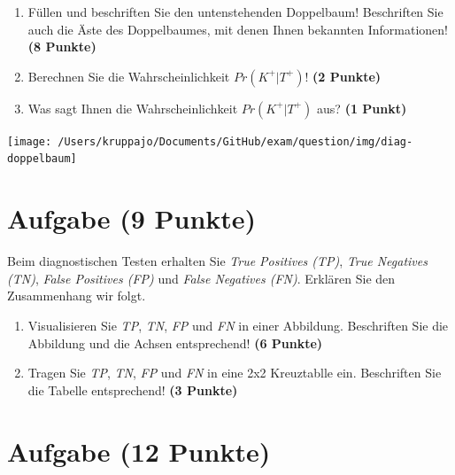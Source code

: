 \documentclass[a4paper, 10pt]{scrartcl}\usepackage[]{graphicx}\usepackage[]{xcolor}
\begin{document}
\begin{enumerate}
\item F{\"u}llen und beschriften Sie den untenstehenden Doppelbaum! Beschriften
  Sie auch die {\"A}ste des Doppelbaumes, mit denen Ihnen bekannten
  Informationen!  \textbf{(8 Punkte)}
\item Berechnen Sie die Wahrscheinlichkeit $Pr(K^+|T^+)$! \textbf{(2 Punkte)}
\item Was sagt Ihnen die Wahrscheinlichkeit $Pr(K^+|T^+)$ aus? \textbf{(1 Punkt)}
\end{enumerate}

\vspace{1cm}

\begin{center}
  \texttt{[image: /Users/kruppajo/Documents/GitHub/exam/question/img/diag-doppelbaum]}
\end{center}



 
\clearpage

\section{Aufgabe \hfill (9 Punkte)}

Beim diagnostischen Testen erhalten Sie \textit{True Positives (TP)},
\textit{True Negatives (TN)}, \textit{False Positives (FP)} und
\textit{False Negatives (FN)}. Erkl{\"a}ren Sie den Zusammenhang wir folgt.

\begin{enumerate}
\item Visualisieren Sie \textit{TP}, \textit{TN}, \textit{FP} und
  \textit{FN} in einer Abbildung. Beschriften Sie die Abbildung und die
  Achsen entsprechend! \textbf{(6 Punkte)}
\item Tragen Sie \textit{TP}, \textit{TN}, \textit{FP} und \textit{FN} in
  eine 2x2 Kreuztablle ein. Beschriften Sie die Tabelle entsprechend!
  \textbf{(3 Punkte)}
\end{enumerate}





 
\clearpage

\section{Aufgabe \hfill (12 Punkte)}
\end{document}
